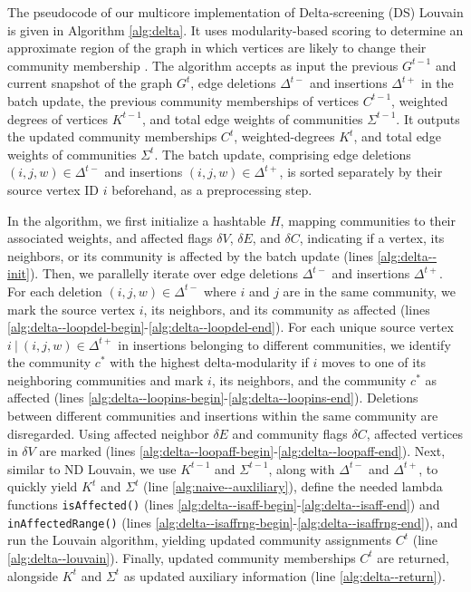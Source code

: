 The pseudocode of our multicore implementation of Delta-screening (DS) Louvain is given in Algorithm \ref{alg:delta}. It uses modularity-based scoring to determine an approximate region of the graph in which vertices are likely to change their community membership \cite{com-zarayeneh21}. The algorithm accepts as input the previous $G^{t-1}$ and current snapshot of the graph $G^t$, edge deletions $\Delta^{t-}$ and insertions $\Delta^{t+}$ in the batch update, the previous community memberships of vertices $C^{t-1}$, weighted degrees of vertices $K^{t-1}$, and total edge weights of communities $\Sigma^{t-1}$. It outputs the updated community memberships $C^t$, weighted-degrees $K^t$, and total edge weights of communities $\Sigma^t$. The batch update, comprising edge deletions $(i, j, w) \in \Delta^{t-}$ and insertions $(i, j, w) \in \Delta^{t+}$, is sorted separately by their source vertex ID $i$ beforehand, as a preprocessing step.




In the algorithm, we first initialize a hashtable $H$, mapping communities to their associated weights, and affected flags $\delta V$, $\delta E$, and $\delta C$, indicating if a vertex, its neighbors, or its community is affected by the batch update (lines \ref{alg:delta--init}). Then, we parallelly iterate over edge deletions $\Delta^{t-}$ and insertions $\Delta^{t+}$. For each deletion $(i, j, w) \in \Delta^{t-}$ where $i$ and $j$ are in the same community, we mark the source vertex $i$, its neighbors, and its community as affected (lines \ref{alg:delta--loopdel-begin}-\ref{alg:delta--loopdel-end}). For each unique source vertex $i\ |\ (i, j, w) \in \Delta^{t+}$ in insertions belonging to different communities, we identify the community $c^*$ with the highest delta-modularity if $i$ moves to one of its neighboring communities and mark $i$, its neighbors, and the community $c^*$ as affected (lines \ref{alg:delta--loopins-begin}-\ref{alg:delta--loopins-end}). Deletions between different communities and insertions within the same community are disregarded. Using affected neighbor $\delta E$ and community flags $\delta C$, affected vertices in $\delta V$ are marked (lines \ref{alg:delta--loopaff-begin}-\ref{alg:delta--loopaff-end}). Next, similar to ND Louvain, we use $K^{t-1}$ and $\Sigma^{t-1}$, along with $\Delta^{t-}$ and $\Delta^{t+}$, to quickly yield $K^t$ and $\Sigma^t$ (line \ref{alg:naive--auxliliary}), define the needed lambda functions \texttt{isAffected()} (lines \ref{alg:delta--isaff-begin}-\ref{alg:delta--isaff-end}) and \texttt{inAffectedRange()} (lines \ref{alg:delta--isaffrng-begin}-\ref{alg:delta--isaffrng-end}), and run the Louvain algorithm, yielding updated community assignments $C^t$ (line \ref{alg:delta--louvain}). Finally, updated community memberships $C^t$ are returned, alongside $K^t$ and $\Sigma^t$ as updated auxiliary information (line \ref{alg:delta--return}).





